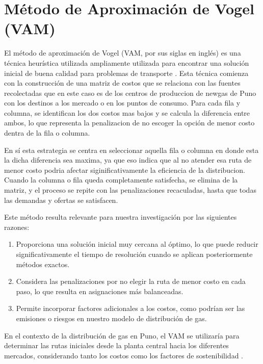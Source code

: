 \documentclass[11pt, a4paper]{article}
\begin{document}
\section{Método de Aproximación de Vogel (VAM)}
El método de aproximación de Vogel (VAM, por sus siglas en inglés) es una técnica heurística utilizada ampliamente utilizada para encontrar una solución inicial de buena calidad para problemas de transporte \citep{Taha2017}.
Esta técnica comienza con la construcción de una matriz de costos que se relaciona con las fuentes recolectadas que en este caso es de los centros de produccion de newgas de Puno con los destinos a los mercado o en los puntos de consumo. Para cada fila y columna, se identifican los dos costos mas bajos y se calcula la diferencia entre ambos, lo que representa la penalizacion de no escoger la opción de menor costo dentra de la fila o columna.

En sí esta estrategia se centra en seleccionar aquella fila o columna en donde esta la dicha diferencia sea maxima, ya que eso indica que al no atender esa ruta de menor costo podria afectar siginificativamente la eficiencia de la distribucion. Cuando la columna o fila queda completamente satisfecha, se elimina de la matriz, y el proceso se repite con las penalizaciones recaculadas, hasta que todas las demandas y ofertas se satisfacen.

Este método resulta relevante para nuestra investigación por las siguientes razones:

\begin{enumerate}[label=\arabic*., leftmargin=*]
    \item Proporciona una solución inicial muy cercana al óptimo, lo que puede reducir significativamente el tiempo de resolución cuando se aplican posteriormente métodos exactos.
    \item Considera las penalizaciones por no elegir la ruta de menor costo en cada paso, lo que resulta en asignaciones más balanceadas.
    \item Permite incorporar factores adicionales a los costos, como podrían ser las emisiones o riesgos en nuestro modelo de distribución de gas.
\end{enumerate}

En el contexto de la distribución de gas en Puno, el VAM se utilizaría para determinar las rutas iniciales desde la planta central hacia los diferentes mercados, considerando tanto los costos como los factores de sostenibilidad \citep{Chopra2018}.
\end{document}
